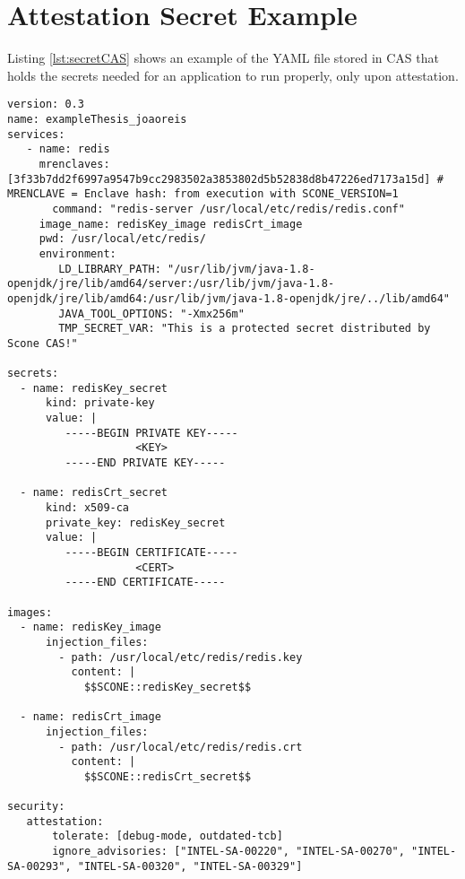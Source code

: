 \chapter{Attestation Secret Example}
\label{app:appendix2}

Listing \ref{lst:secretCAS} shows an example of the YAML file stored in CAS that holds the secrets needed for an application to run properly, only upon attestation.

\begin{lstlisting}
version: 0.3
name: exampleThesis_joaoreis
services:
   - name: redis
     mrenclaves: [3f33b7dd2f6997a9547b9cc2983502a3853802d5b52838d8b47226ed7173a15d] # MRENCLAVE = Enclave hash: from execution with SCONE_VERSION=1
	   command: "redis-server /usr/local/etc/redis/redis.conf"
     image_name: redisKey_image redisCrt_image
     pwd: /usr/local/etc/redis/
     environment:
        LD_LIBRARY_PATH: "/usr/lib/jvm/java-1.8-openjdk/jre/lib/amd64/server:/usr/lib/jvm/java-1.8-openjdk/jre/lib/amd64:/usr/lib/jvm/java-1.8-openjdk/jre/../lib/amd64"
        JAVA_TOOL_OPTIONS: "-Xmx256m"
        TMP_SECRET_VAR: "This is a protected secret distributed by Scone CAS!"
	
secrets:   
  - name: redisKey_secret
	  kind: private-key
	  value: |
	     -----BEGIN PRIVATE KEY-----
	                <KEY>
	     -----END PRIVATE KEY-----
	
  - name: redisCrt_secret
	  kind: x509-ca
	  private_key: redisKey_secret
	  value: |
	     -----BEGIN CERTIFICATE-----
	                <CERT>
	     -----END CERTIFICATE-----
	
images:
  - name: redisKey_image
	  injection_files:
	    - path: /usr/local/etc/redis/redis.key
	      content: |
	        $$SCONE::redisKey_secret$$
	
  - name: redisCrt_image
	  injection_files:
	    - path: /usr/local/etc/redis/redis.crt
	      content: |
	        $$SCONE::redisCrt_secret$$
	
security:
   attestation:
	   tolerate: [debug-mode, outdated-tcb]
	   ignore_advisories: ["INTEL-SA-00220", "INTEL-SA-00270", "INTEL-SA-00293", "INTEL-SA-00320", "INTEL-SA-00329"]
\end{lstlisting}
\label{lst:secretCAS}